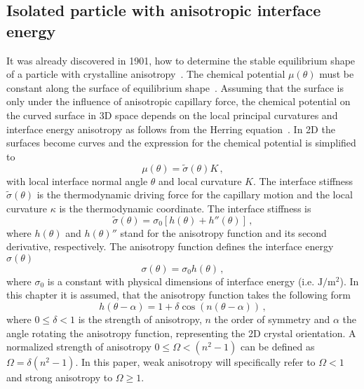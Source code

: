 	\subsection{Isolated particle with anisotropic interface energy} \label{sec_isol_aniso_particle}
	It was already discovered in 1901, how to determine the stable equilibrium shape of a particle with crystalline anisotropy~\cite{Wulff1901}. The chemical potential $\mu(\theta)$ must be constant along the surface of equilibrium shape~\cite{Bao2017}. Assuming that the surface is only under the influence of anisotropic capillary force, the chemical potential on the curved surface in 3D space depends on the local principal curvatures and interface energy anisotropy as follows from the Herring equation~\cite{Herring1951, Johnson1965}. In 2D the surfaces become curves and the expression for the chemical potential is simplified to
	\begin{equation}\label{eq_chempot_constant}
		\mu(\theta) = \tilde{\sigma}(\theta)K \,,
	\end{equation}
	with local interface normal angle $\theta$ and local curvature $K$. The interface stiffness $\tilde{\sigma}(\theta)$ is the thermodynamic driving force for the capillary motion and the local curvature $\kappa$ is the thermodynamic coordinate. The interface stiffness is 
	\begin{equation} \label{eq_def_interface_siffness}
		\tilde{\sigma}(\theta)=\sigma_0[h(\theta)+h''(\theta)] \,,
	\end{equation}
	where $h(\theta)$ and $h(\theta)''$ stand for the anisotropy function and its second derivative, respectively. The anisotropy function defines the interface energy $\sigma(\theta)$
	\begin{equation} \label{eq_anisoIE}
		\sigma(\theta) = \sigma_0  h(\theta) \,,
	\end{equation}
	where $\sigma_0$ is a constant with physical dimensions of interface energy (i.e. $\mathrm{J/m^2}$). In this chapter it is assumed, that the anisotropy function takes the following form 
	\begin{equation} \label{eq_anisofun}
		h(\theta -\alpha) = 1+\delta\cos(n(\theta-\alpha)) \,,
	\end{equation}
	where $0\leq\delta<1$ is the strength of anisotropy, $n$ the order of symmetry and $\alpha$ the angle rotating the anisotropy function, representing the 2D crystal orientation. A normalized strength of anisotropy $0\leq \Omega < (n^2-1)$ can be defined as $\Omega=\delta(n^2-1)$. In this paper, weak anisotropy will specifically refer to $\Omega<1$ and strong anisotropy to $\Omega\geq1$.
	
